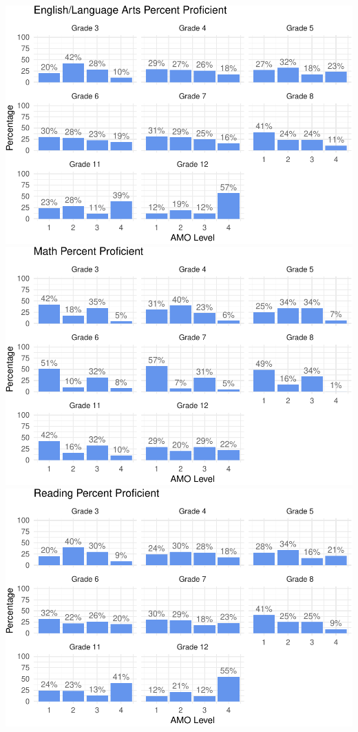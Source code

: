 \documentclass[]{article}
\begin{document}
\clearpage

\includegraphics{Critical_Element_3_files/figure-latex/amo_plot-1.pdf}
\includegraphics{Critical_Element_3_files/figure-latex/amo_plot-2.pdf}
\includegraphics{Critical_Element_3_files/figure-latex/amo_plot-3.pdf}
\end{document}
